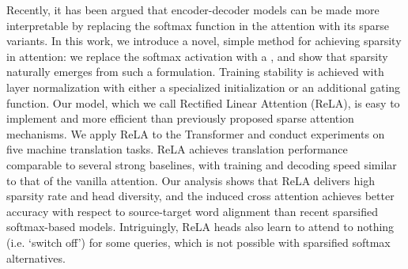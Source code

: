Recently, it has been argued that encoder-decoder models can be made more interpretable by replacing the softmax function in the attention with its sparse variants. In this work, we introduce a novel, simple method for achieving sparsity in attention: we replace the softmax activation with a \relu, and show that sparsity naturally emerges from such a formulation. Training stability is achieved with layer normalization with either a specialized initialization or an additional gating function. Our model, which we call Rectified Linear Attention (ReLA), is easy to implement and more efficient than previously proposed sparse attention mechanisms. We apply ReLA to the Transformer and conduct experiments on five machine translation tasks.  ReLA achieves translation performance comparable to several strong baselines, with training and decoding speed similar to that of the vanilla attention. Our analysis shows that ReLA delivers high sparsity rate and head diversity, and the induced cross attention achieves better accuracy with respect to source-target word alignment than recent sparsified softmax-based models. Intriguingly, ReLA heads also learn to attend to nothing (i.e. `switch off') for some queries, which is not possible with sparsified softmax alternatives.
